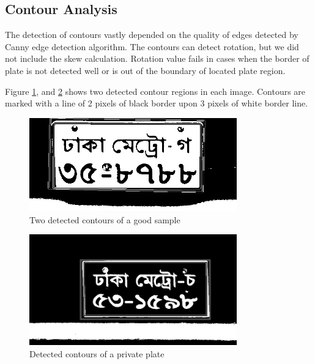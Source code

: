 \subsection{Contour Analysis}
The detection of contours vastly depended on the quality of edges detected by Canny edge detection algorithm. The contours can detect rotation, but we did not include the skew calculation. Rotation value fails in cases when the border of plate is not detected well or is out of the boundary of located plate region.

Figure \ref{fig:ContourResult1}, and \ref{fig:ContourResult2} shows two detected contour regions in each image. Contours are marked with a line of 2 pixels of black border upon 3 pixels of white border line.

\begin{figure}
\centering
\includegraphics[width=0.8\textwidth]{./img/experiment/stage.12/00-good}    
\caption{Two detected contours of a good sample}
\label{fig:ContourResult1}
\end{figure}

\begin{figure}
\centering
\includegraphics[width=0.8\textwidth]{./img/experiment/stage.12/00-private2}
\caption{Detected contours of a private plate}
\label{fig:ContourResult2}
\end{figure}

